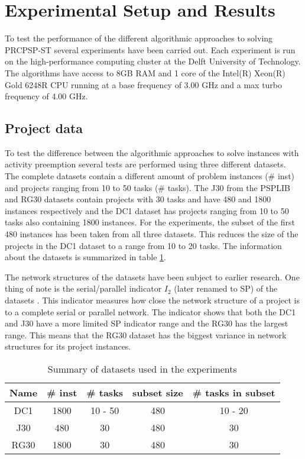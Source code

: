 \section{Experimental Setup and Results}
To test the performance of the different algorithmic approaches to solving PRCPSP-ST several experiments have been carried out.
Each experiment is run on the high-performance computing cluster at the Delft University of Technology. The algorithms have access to 8GB RAM and 1 core of the Intel(R) Xeon(R) Gold 6248R CPU running at a base frequency of 3.00 GHz and a max turbo frequency of 4.00 GHz.

\subsection{Project data}
To test the difference between the algorithmic approaches to solve instances with activity preemption several tests are performed using three different datasets. The complete datasets contain a different amount of problem instances (\# inst) and projects ranging from 10 to 50 tasks (\# tasks). The J30 from the PSPLIB \cite{RN25} and RG30 datasets contain projects with 30 tasks and have 480 and 1800 instances respectively and the DC1 dataset has projects ranging from 10 to 50 tasks also containing 1800 instances. For the experiments, the subset of the first 480 instances has been taken from all three datasets. This reduces the size of the projects in the DC1 dataset to a range from 10 to 20 tasks. The information about the datasets is summarized in table \ref{table:table1}.

The network structures of the datasets have been subject to earlier research. One thing of note is the serial/parallel indicator \(I_2\) (later renamed to SP) of the datasets \cite{RN65, RN63}. This indicator measures how close the network structure of a project is to a complete serial or parallel network. The indicator shows that both the DC1 and J30 have a more limited SP indicator range and the RG30 has the largest range. This means that the RG30 dataset has the biggest variance in network structures for its project instances.

\begin{table}
	\begin{center}
		\caption{Summary of datasets used in the experiments}
		\label{table:table1}
		\begin{tabular}{ c | c c c c }
			Name & \# inst & \# tasks & subset size & \# tasks in subset \\
			\hline
			DC1 & 1800 & 10 - 50 & 480 & 10 - 20 \\
			J30 & 480 & 30 & 480 & 30 \\
			RG30 & 1800 & 30 & 480 & 30
		\end{tabular}
	\end{center}
\end{table}

